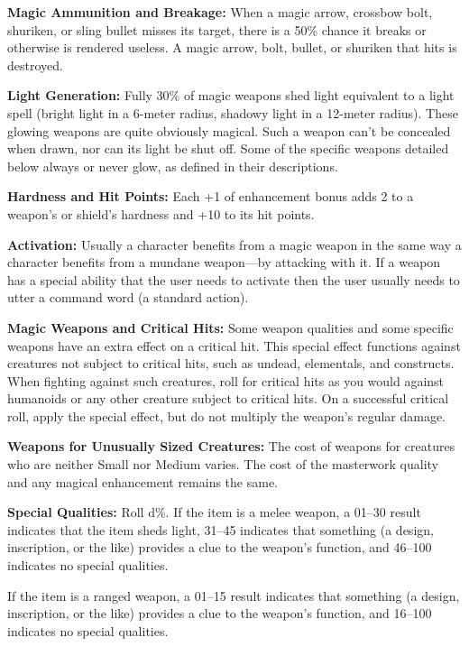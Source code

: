 \textbf{Magic Ammunition and Breakage:} When a magic arrow, crossbow bolt, shuriken, or sling bullet misses its target, there is a 50\% chance it breaks or otherwise is rendered useless. A magic arrow, bolt, bullet, or shuriken that hits is destroyed.

\textbf{Light Generation:} Fully 30\% of magic weapons shed light equivalent to a light spell (bright light in a 6-meter radius, shadowy light in a 12-meter radius). These glowing weapons are quite obviously magical. Such a weapon can't be concealed when drawn, nor can its light be shut off. Some of the specific weapons detailed below always or never glow, as defined in their descriptions.

\textbf{Hardness and Hit Points:} Each +1 of enhancement bonus adds 2 to a weapon's or shield's hardness and +10 to its hit points.

\textbf{Activation:} Usually a character benefits from a magic weapon in the same way a character benefits from a mundane weapon---by attacking with it. If a weapon has a special ability that the user needs to activate then the user usually needs to utter a command word (a standard action).

\textbf{Magic Weapons and Critical Hits:} Some weapon qualities and some specific weapons have an extra effect on a critical hit. This special effect functions against creatures not subject to critical hits, such as undead, elementals, and constructs. When fighting against such creatures, roll for critical hits as you would against humanoids or any other creature subject to critical hits. On a successful critical roll, apply the special effect, but do not multiply the weapon's regular damage.

\textbf{Weapons for Unusually Sized Creatures:} The cost of weapons for creatures who are neither Small nor Medium varies. The cost of the masterwork quality and any magical enhancement remains the same.

\textbf{Special Qualities:} Roll d\%. If the item is a melee weapon, a 01--30 result indicates that the item sheds light, 31--45 indicates that something (a design, inscription, or the like) provides a clue to the weapon's function, and 46--100 indicates no special qualities.

If the item is a ranged weapon, a 01--15 result indicates that something (a design, inscription, or the like) provides a clue to the weapon's function, and 16--100 indicates no special qualities.
